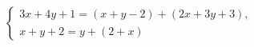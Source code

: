\begin{ex}
	\begin{condition}
		\( \left\{
		\begin{array}{l}
			3x+4y+1=(x+y-2)+(2x+3y+3),\\
			x+y+2=y+(2+x)
		\end{array}
		\right. \)
	\end{condition}
\end{ex}